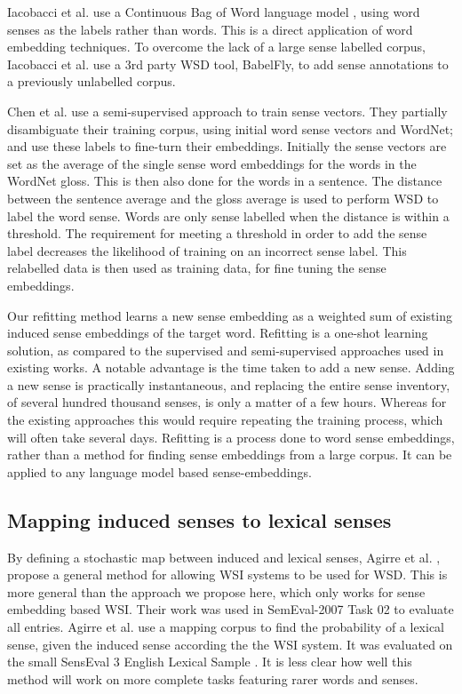 \documentclass{article}
\def\parencite{\cite}
\begin{document}
Iacobacci et al.  use a Continuous Bag of Word language model \parencite{mikolov2013efficient}, using word senses as the labels rather than words. This is a direct application of word embedding techniques. To overcome the lack of a large sense labelled corpus, Iacobacci et al. use a 3rd party WSD tool, BabelFly, to add sense annotations to a previously unlabelled corpus.

Chen et al.  use a semi-supervised approach to train sense vectors. They partially disambiguate their training corpus, using initial word sense vectors and WordNet; and use these labels to fine-turn their embeddings.
Initially the sense vectors are set as the average of the single sense word embeddings \parencite{mikolov2013efficient} for the words in the WordNet gloss. This is then also done for the words in a sentence. The distance between the sentence average and the gloss average is used to perform WSD to label the word sense. Words are only sense labelled when the distance is within a threshold. The requirement for meeting a threshold in order to add the sense label  decreases the likelihood of training on an incorrect sense label.
This relabelled data is then used as training data, for fine tuning the sense embeddings.


Our refitting method learns a new sense embedding as a weighted sum of existing induced sense embeddings of the target word.
Refitting is a one-shot learning solution, as compared to the supervised and semi-supervised approaches used in existing works. A notable advantage is the time taken to add a new sense.
Adding a new sense is practically instantaneous, and replacing the entire sense inventory, of several hundred thousand senses, is only a matter of a few hours.
Whereas for the existing approaches this would require repeating the training process, which will often take several days.
Refitting is a process done to word sense embeddings, rather than a method for finding sense embeddings from a large corpus. 
It can be applied to any language model based sense-embeddings.


\subsection{Mapping induced senses to lexical senses}\label{mapping}
By defining a stochastic map between induced and lexical senses, Agirre et al. , propose a general method for allowing WSI systems to be used for WSD. This is more general than the approach we propose here, which only works for sense embedding based WSI. 
Their work was used in SemEval-2007 Task 02 \parencite{SemEval2007WSIandWSD} to evaluate all entries. 
Agirre et al. use a mapping corpus to find the probability of a lexical sense, given the induced sense according the the WSI system.
It was evaluated on the small SensEval 3 English Lexical Sample \parencite{mihalcea2004senseval}. It is less clear how well this method will work on more complete tasks featuring rarer words and senses. 
\end{document}
